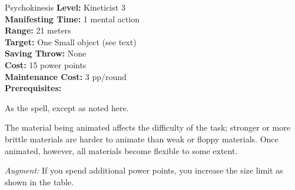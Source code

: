 {Psychokinesis}
{
	\textbf{Level:}
	Kineticist 3\\
	\textbf{Manifesting Time:}
	1 mental action\\
	\textbf{Range:}
	21 meters\\
	\textbf{Target:}
	One Small object (see text)\\
	\textbf{Saving Throw:}
	None\\
	\textbf{Cost:}
	15 power points\\
	\textbf{Maintenance Cost:}
	3 pp/round\\
	\textbf{Prerequisites:}
	\\
}
{
	As the  spell, except as noted here.

	The material being animated affects the difficulty of the task; stronger or more brittle materials are harder to animate than weak or floppy materials. Once animated, however, all materials become flexible to some extent.


	\textit{Augment:} If you spend additional power points, you increase the size limit as shown in the table.
}